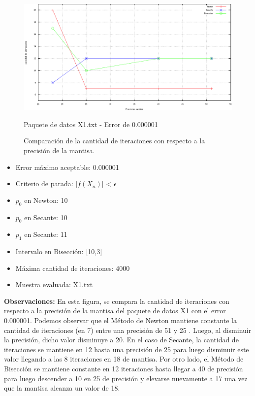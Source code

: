 \documentclass[10pt, a4paper]{article}
\begin{document}
\begin{figure}[H] %
\begin{center}
\includegraphics[width=370pt]{./cantidaditeraciones_mantisax1error.png}
\caption[h]{Comparaci\'on de la cantidad de iteraciones con respecto a la precisi\'on de la mantisa.}{Paquete de datos X1.txt - Error de 0.000001}
\end{center}
\end{figure}

\begin{itemize}
\item Error m\'aximo aceptable: 0.000001
\item Criterio de parada: $|f(X_{n})|$ < $\epsilon$ 
\item $p_{0}$ en Newton: 10
\item $p_{0}$ en Secante: 10
\item $p_{1}$ en Secante: 11
\item Intervalo en Bisecci\'on: [10,3]
\item M\'axima cantidad de iteraciones: 4000
\item Muestra evaluada: X1.txt
\end{itemize}

\large{\textbf{Observaciones:}}
En esta figura, se compara la cantidad de iteraciones con respecto a la precisi\'on de la mantisa del paquete de datos X1 con el error 0.000001.\newline
Podemos observar que el M\'etodo de Newton mantiene constante la cantidad de iteraciones (en 7) entre una precisi\'on de 51 y 25 . Luego, al disminuir la precisi\'on, dicho valor disminuye a 20. En el caso de Secante, la cantidad de iteraciones se mantiene en 12 hasta una precisi\'on de 25 para luego disminuir este valor llegando a las 8 iteraciones en 18 de mantisa. Por otro lado, el M\'etodo de Bisecci\'on se mantiene constante en 12 iteraciones hasta llegar a 40 de precisi\'on para luego descender a 10 en 25 de precisi\'on y elevarse nuevamente a 17 una vez que la mantisa alcanza un valor de 18.\newline
 
\end{document}
